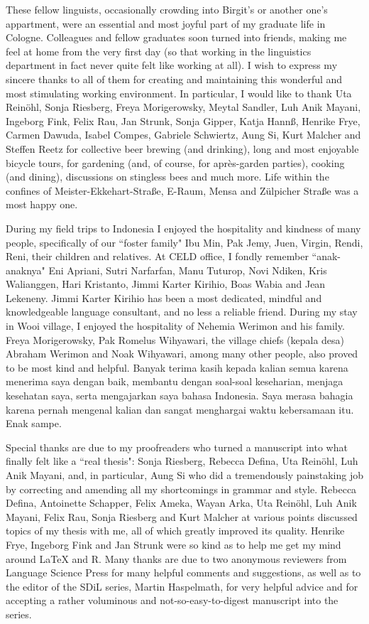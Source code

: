 \begin{refsection}
These fellow linguists, occasionally crowding into Birgit's or another one's appartment, were an essential and most joyful part of my graduate life in Cologne. Colleagues and fellow graduates soon turned into friends, making me feel at home from the very first day (so that working in the linguistics department in fact never quite felt like working at all). I wish to express my sincere thanks to all of them for creating and maintaining this wonderful and most stimulating working environment. In particular, I would like to thank Uta Reinöhl, Sonja Riesberg, Freya Morigerowsky, Meytal Sandler, Luh Anik Mayani, Ingeborg Fink, Felix Rau, Jan Strunk, Sonja Gipper, Katja Hannß, Henrike Frye, Carmen Dawuda, Isabel Compes, Gabriele Schwiertz, Aung Si, Kurt Malcher and Steffen Reetz for collective beer brewing (and drinking), long and most enjoyable bicycle tours, for gardening (and, of course, for après-garden parties), cooking (and dining), discussions on stingless bees and much more. Life within the confines of Meister-Ekkehart-Straße, E-Raum, Mensa and Zülpicher Straße was a most happy one.

During my field trips to Indonesia I enjoyed the hospitality and kindness of many people, specifically of our ``foster family" Ibu Min, Pak Jemy, Juen, Virgin, Rendi, Reni, their children and relatives. At CELD office, I fondly remember ``anak-anaknya" Eni Apriani, Sutri Narfarfan, Manu Tuturop, Novi Ndiken, Kris Walianggen, Hari Kristanto, Jimmi Karter Kirihio, Boas Wabia and Jean Lekeneny. Jimmi Karter Kirihio has been a most dedicated, mindful and knowledgeable language consultant, and no less a reliable friend. During my stay in Wooi village, I enjoyed the hospitality of Nehemia Werimon and his family. Freya Morigerowsky, Pak Romelus Wihyawari, the village chiefs (kepala desa) Abraham Werimon and Noak Wihyawari, among many other people, also proved to be most kind and helpful. Banyak terima kasih kepada kalian semua karena menerima saya dengan baik, membantu dengan soal-soal keseharian, menjaga kesehatan saya, serta mengajarkan saya bahasa Indonesia. Saya merasa bahagia karena pernah mengenal kalian dan sangat menghargai waktu kebersamaan itu. Enak sampe.

Special thanks are due to my proofreaders who turned a manuscript into what finally felt like a ``real thesis": Sonja Riesberg, Rebecca Defina, Uta Reinöhl, Luh Anik Mayani, and, in particular, Aung Si who did a tremendously painstaking job by correcting and amending all my shortcomings in grammar and style. Rebecca Defina, Antoinette Schapper, Felix Ameka, Wayan Arka, Uta Reinöhl, Luh Anik Mayani, Felix Rau, Sonja Riesberg and Kurt Malcher at various points discussed topics of my thesis with me, all of which greatly improved its quality. Henrike Frye, Ingeborg Fink and Jan Strunk were so kind as to help me get my mind around LaTeX and R. Many thanks are due to two anonymous reviewers from Language Science Press for many helpful comments and suggestions, as well as to the editor of the SDiL series, Martin Haspelmath, for very helpful advice and for accepting a rather voluminous and not-so-easy-to-digest manuscript into the series.


\end{refsection}
